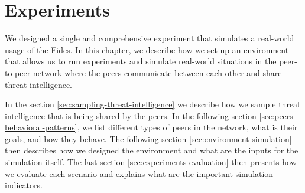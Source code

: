 \chapter{Experiments}
\label{ch:experiments}
We designed a single and comprehensive experiment that simulates a real-world usage of the Fides.
In this chapter, we describe how we set up an environment that allows us to run experiments and simulate real-world situations in the peer-to-peer network where the peers communicate between each other and share threat intelligence.

In the section \ref{sec:sampling-threat-intelligence} we describe how we sample threat intelligence that is being shared by the peers.
In the following section \ref{sec:peers-behavioral-patterns}, we list different types of peers in the network, what is their goals, and how they behave.
The following section \ref{sec:environment-simulation} then describes how we designed the environment and what are the inputs for the simulation itself.
The last section \ref{sec:experiments-evaluation} then presents how we evaluate each scenario and explains what are the important simulation indicators.








